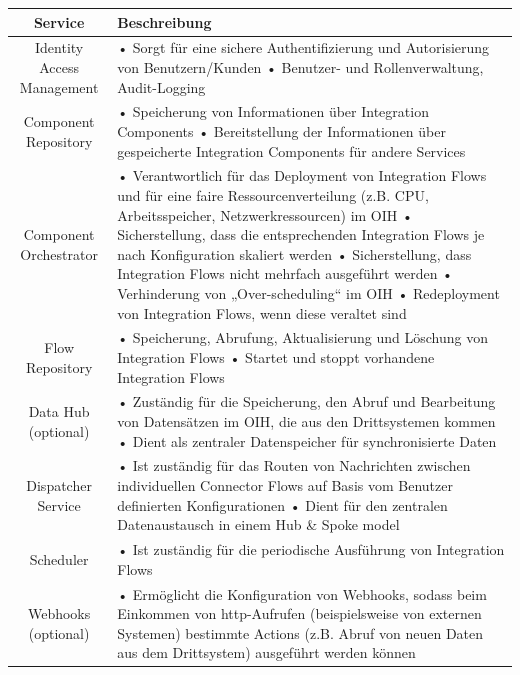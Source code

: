 \begin{longtable}{|c|p{} |} \hline
\textbf{Service} & \textbf{Beschreibung}\\ \hline \bottomrule
Identity Access Management & •	Sorgt für eine sichere Authentifizierung und Autorisierung von Benutzern/Kunden \newline • Benutzer- und Rollenverwaltung, Audit-Logging \\ \hline
Component Repository & • Speicherung von Informationen über Integration Components \newline  • Bereitstellung der Informationen über gespeicherte Integration Components für andere Services \\ \hline
Component Orchestrator & •	Verantwortlich für das Deployment von Integration Flows und für eine faire Ressourcenverteilung (z.B. CPU, Arbeitsspeicher, Netzwerkressourcen) im OIH
\newline •	Sicherstellung, dass die entsprechenden Integration Flows je nach Konfiguration skaliert werden
\newline •	Sicherstellung, dass Integration Flows nicht mehrfach ausgeführt werden
\newline •	Verhinderung von „Over-scheduling“ im OIH
\newline •	Redeployment von Integration Flows, wenn diese veraltet sind \\ \hline
Flow Repository & •	Speicherung, Abrufung, Aktualisierung und Löschung von Integration Flows
\newline •	Startet und stoppt vorhandene Integration Flows \\ \hline
Data Hub (optional) & •	Zuständig für die Speicherung, den Abruf und Bearbeitung von Datensätzen im OIH, die aus den Drittsystemen kommen
\newline •	Dient als zentraler Datenspeicher für synchronisierte Daten \\ \hline
Dispatcher Service & •	Ist zuständig für das Routen von Nachrichten zwischen individuellen Connector Flows auf Basis vom Benutzer definierten Konfigurationen
\newline •	Dient für den zentralen Datenaustausch in einem Hub \& Spoke model \\ \hline
Scheduler & •	Ist zuständig für die periodische Ausführung von Integration Flows \\ \hline
Webhooks (optional) & •	Ermöglicht die Konfiguration von Webhooks, sodass beim Einkommen von http-Aufrufen (beispielsweise von externen Systemen) bestimmte Actions (z.B. Abruf von neuen Daten aus dem Drittsystem) ausgeführt werden können \\ \hline

\end{longtable}
